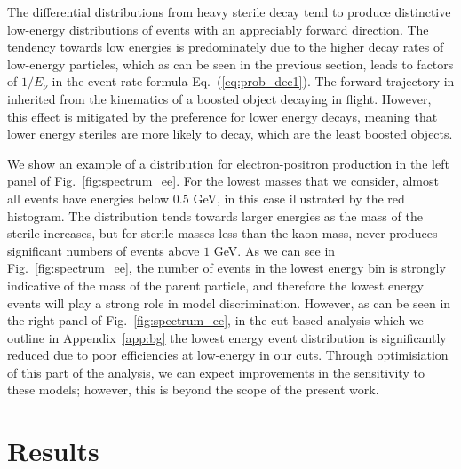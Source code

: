 \documentclass[11pt, a4paper]{article}
\newcommand{\refeq}[1]{Eq.~(\ref{#1})}
\newcommand{\reffig}[1]{Fig.~\ref{#1}}
\newcommand{\refapp}[1]{Appendix~\ref{#1}}
\begin{document}
The differential distributions from heavy sterile decay tend to produce
distinctive low-energy distributions of events with an appreciably forward
direction. 
%
The tendency towards low energies is predominately due to the higher decay
rates of low-energy particles, which as can be seen in the previous section,
leads to factors of $1/E_\nu$ in the event rate formula \refeq{eq:prob_dec1}.
%
The forward trajectory in inherited from the kinematics of a boosted object
decaying in flight. However, this effect is mitigated by the preference for
lower energy decays, meaning that lower energy steriles are more likely to
decay, which are the least boosted objects.

We show an example of a distribution for electron-positron production in the
left panel of \reffig{fig:spectrum_ee}. For the lowest masses that we consider,
almost all events have energies below $0.5$ GeV, in this case illustrated by
the red histogram. The distribution tends towards larger energies as the mass
of the sterile increases, but for sterile masses less than the kaon mass, never
produces significant numbers of events above $1$ GeV. As we can see in
\reffig{fig:spectrum_ee}, the number of events in the lowest energy bin is
strongly indicative of the mass of the parent particle, and therefore the
lowest energy events will play a strong role in model discrimination. However,
as can be seen in the right panel of \reffig{fig:spectrum_ee}, in the cut-based
analysis which we outline in \refapp{app:bg} the lowest energy event
distribution is significantly reduced due to poor efficiencies at low-energy in
our cuts. Through optimisiation of this part of the analysis, we can expect
improvements in the sensitivity to these models; however, this is beyond the
scope of the present work. 



%
%
%

\section{\label{sec:sensitivities}Results}
\end{document}
